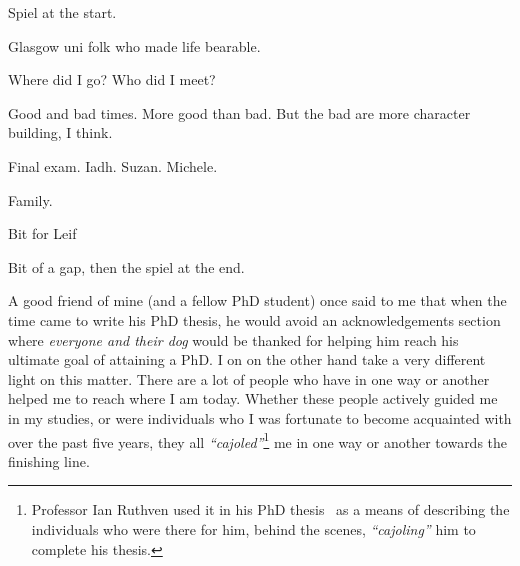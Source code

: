 

\begin{preamble}
{}

Spiel at the start.

\acksep

Glasgow uni folk who made life bearable.

Where did I go? Who did I meet?

Good and bad times. More good than bad. But the bad are more character building, I think.

Final exam. Iadh. Suzan. Michele.

Family.

Bit for Leif

\acksep

Bit of a gap, then the spiel at the end.





\pagebreak

A good friend of mine (and a fellow PhD student) once said to me that when the time came to write his PhD thesis, he would avoid an acknowledgements section where \emph{everyone and their dog} would be thanked for helping him reach his ultimate goal of attaining a PhD. I on on the other hand take a very different light on this matter. There are a lot of people who have in one way or another helped me to reach where I am today. Whether these people actively guided me in my studies, or were individuals who I was fortunate to become acquainted with over the past five years, they all \emph{``cajoled''}\footnote{Professor Ian Ruthven used it in his PhD thesis~\citep{ruthven2001phd} as a means of describing the individuals who were there for him, behind the scenes, \emph{``cajoling''} him to complete his thesis.} me in one way or another towards the finishing line.


\end{preamble}
